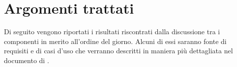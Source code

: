 %



\section{Argomenti trattati} %
\label{sec:argomenti_trattati}
Di seguito vengono riportati i risultati riscontrati dalla discussione tra i componenti in merito all'ordine del giorno. \newline
Alcuni di essi saranno fonte di requisiti e di casi d'uso che verranno descritti in maniera più dettagliata nel documento di \docNameVersionAdR.
